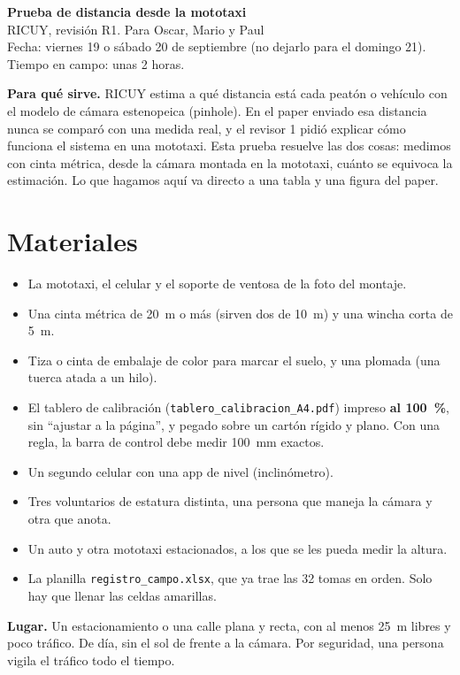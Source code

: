 \documentclass[10pt,a4paper]{article}
\begin{document}
\sloppy

{\Large\bfseries Prueba de distancia desde la mototaxi}\\[2pt]
{\large RICUY, revisión R1. Para Oscar, Mario y Paul}\\[2pt]
Fecha: viernes 19 o sábado 20 de septiembre (no dejarlo para el domingo 21). Tiempo en campo: unas 2 horas.

\medskip
\textbf{Para qué sirve.} RICUY estima a qué distancia está cada peatón o vehículo con el modelo de cámara
estenopeica (pinhole). En el paper enviado esa distancia nunca se comparó con una medida real, y el revisor 1
pidió explicar cómo funciona el sistema en una mototaxi. Esta prueba resuelve las dos cosas: medimos con cinta
métrica, desde la cámara montada en la mototaxi, cuánto se equivoca la estimación. Lo que hagamos aquí va
directo a una tabla y una figura del paper.

\section*{Materiales}
\begin{itemize}
  \item La mototaxi, el celular y el soporte de ventosa de la foto del montaje.
  \item Una cinta métrica de 20~m o más (sirven dos de 10~m) y una wincha corta de 5~m.
  \item Tiza o cinta de embalaje de color para marcar el suelo, y una plomada (una tuerca atada a un hilo).
  \item El tablero de calibración (\texttt{tablero\_calibracion\_A4.pdf}) impreso \textbf{al 100~\%}, sin
        ``ajustar a la página'', y pegado sobre un cartón rígido y plano. Con una regla, la barra de control
        debe medir 100~mm exactos.
  \item Un segundo celular con una app de nivel (inclinómetro).
  \item Tres voluntarios de estatura distinta, una persona que maneja la cámara y otra que anota.
  \item Un auto y otra mototaxi estacionados, a los que se les pueda medir la altura.
  \item La planilla \texttt{registro\_campo.xlsx}, que ya trae las 32 tomas en orden. Solo hay que llenar las
        celdas amarillas.
\end{itemize}

\textbf{Lugar.} Un estacionamiento o una calle plana y recta, con al menos 25~m libres y poco tráfico. De día,
sin el sol de frente a la cámara. Por seguridad, una persona vigila el tráfico todo el tiempo.
\end{document}
